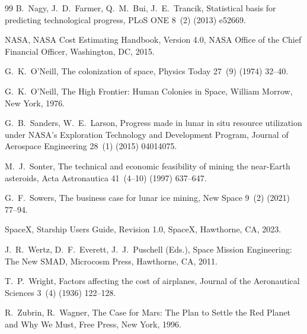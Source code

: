 \documentclass[preprint,12pt]{elsarticle}
\begin{document}
\begin{thebibliography}{99}
B.~Nagy, J.~D.~Farmer, Q.~M.~Bui, J.~E.~Trancik,
\newblock Statistical basis for predicting technological progress,
\newblock PLoS ONE 8~(2) (2013) e52669.

NASA,
\newblock NASA Cost Estimating Handbook, Version 4.0,
\newblock NASA Office of the Chief Financial Officer, Washington, DC, 2015.

G.~K.~O'Neill,
\newblock The colonization of space,
\newblock Physics Today 27~(9) (1974) 32--40.

G.~K.~O'Neill,
\newblock The High Frontier: Human Colonies in Space,
\newblock William Morrow, New York, 1976.

G.~B.~Sanders, W.~E.~Larson,
\newblock Progress made in lunar in situ resource utilization under NASA's Exploration Technology and Development Program,
\newblock Journal of Aerospace Engineering 28~(1) (2015) 04014075.

M.~J.~Sonter,
\newblock The technical and economic feasibility of mining the near-Earth asteroids,
\newblock Acta Astronautica 41~(4--10) (1997) 637--647.

G.~F.~Sowers,
\newblock The business case for lunar ice mining,
\newblock New Space 9~(2) (2021) 77--94.

SpaceX,
\newblock Starship Users Guide, Revision 1.0,
\newblock SpaceX, Hawthorne, CA, 2023.

J.~R.~Wertz, D.~F.~Everett, J.~J.~Puschell (Eds.),
\newblock Space Mission Engineering: The New SMAD,
\newblock Microcosm Press, Hawthorne, CA, 2011.

T.~P.~Wright,
\newblock Factors affecting the cost of airplanes,
\newblock Journal of the Aeronautical Sciences 3~(4) (1936) 122--128.

R.~Zubrin, R.~Wagner,
\newblock The Case for Mars: The Plan to Settle the Red Planet and Why We Must,
\newblock Free Press, New York, 1996.

\end{thebibliography}
\end{document}
